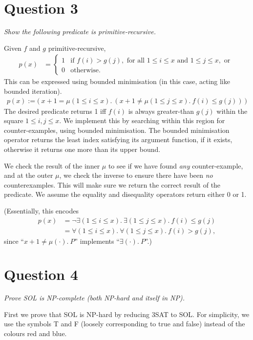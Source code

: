 \documentclass[a4paper]{article}
\begin{document}
\section*{Question 3}
\begin{center}
  \textit{Show the following predicate is primitive-recursive.}
\end{center}
Given $f$ and $g$ primitive-recursive,
\begin{align*}
  p(x) &= \begin{cases}
    1 & \text{if } f(i) > g(j),\text{ for all } 1 \le i \le x \text{ and } 1 \le j \le x,\text{ or } \\
    0 & \text{otherwise.}
  \end{cases}
\end{align*}
This can be expressed using bounded minimisation
(in this case, acting like bounded iteration).
\begin{align*}
  p(x) := \big(~x+1 = \mu(1\le i \le x).~(x+1 \ne \mu(1\le j \le x).~f(i) \le g(j))~\big)
\end{align*}
The desired predicate returns 1 iff $f(i)$ is always
greater-than $g(j)$ within
the square $1 \le i,j \le x$.
We implement this by searching within this region for counter-examples,
using bounded minimisation.
The bounded minimisation operator returns the least index satisfying its
argument function, if it exists, otherwise it returns one more than its upper bound.

We check the result of the inner $\mu$ to see if we have found \textit{any} counter-example,
and at the outer $\mu$, we check the inverse to ensure there have been \textit{no} counterexamples.
This will make sure we return the correct result of the predicate.
We assume the equality and disequality operators return either 0 or 1.

(Essentially, this encodes
\begin{align*}
  p(x) &= \neg \exists(1 \le i \le x).~\exists(1 \le j \le x).~f(i) \le g(j) \\
       &= \forall(1 \le i \le x).~\forall(1 \le j \le x).~f(i) > g(j),
\end{align*}
since ``$x + 1 \ne \mu(\cdot).~P$'' implements ``$\exists(\cdot).~P$''.)

\section*{Question 4}
\begin{center}
  \textit{
  Prove SOL  is {NP}-complete (both {NP}-hard and itself in {NP}).}
\end{center}
First we prove that SOL  is {NP}-hard by reducing 3SAT to SOL.
For simplicity, we use the symbols T and F (loosely corresponding to true and false) instead of the colours red and blue.
\end{document}

